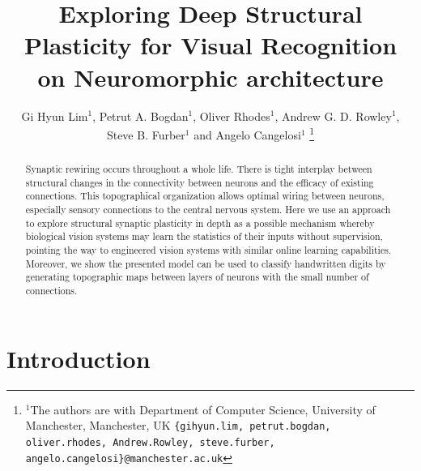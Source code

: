 \documentclass[letterpaper, 10 pt, conference]{ieeeconf}  %
\title{Exploring Deep Structural Plasticity for Visual Recognition on Neuromorphic architecture}
\author{Gi Hyun Lim$^{1}$, Petrut A. Bogdan$^{1}$, Oliver Rhodes$^{1}$, Andrew G. D. Rowley$^{1}$, \\ 
         Steve B. Furber$^{1}$ and Angelo Cangelosi$^{1}$%
\thanks{$^{1}$The authors are with Department of Computer Science, University of Manchester, Manchester, UK
{\tt\small \{gihyun.lim, petrut.bogdan, oliver.rhodes, Andrew.Rowley, steve.furber, angelo.cangelosi\}@manchester.ac.uk}}%
}
\begin{document}
\maketitle
\thispagestyle{empty}
\pagestyle{empty}


\begin{abstract}
Synaptic rewiring occurs throughout a whole life. There is tight interplay between structural changes in the connectivity between neurons and the efficacy of existing connections. This topographical organization allows optimal wiring between neurons, especially sensory connections to the central nervous system.
Here we use an approach to explore structural synaptic plasticity in depth as a possible mechanism whereby biological vision systems may learn the statistics of their inputs without supervision, pointing the way to engineered vision systems with similar online learning capabilities.
Moreover, we show the presented model can be used to classify handwritten digits by generating topographic maps between layers of neurons with the small number of connections.
\end{abstract}

\section{Introduction}
\end{document}
